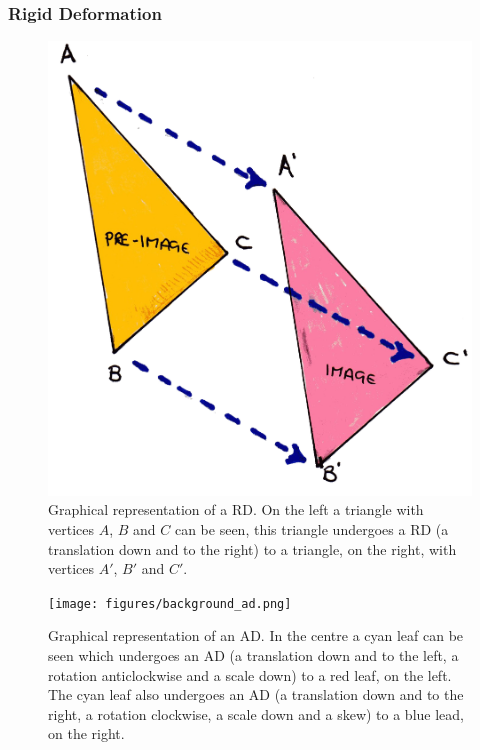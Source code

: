             \subsubsection{Rigid Deformation} \label{sec:rigid_deformation}
                \begin{figure}
                    \centering
                    
                    \includegraphics[width=1.0\linewidth]{figures/background_rd.png}
                    
                    \captionsetup{singlelinecheck=false, justification=raggedright}
                    \caption{Graphical representation of a \gls{RD}. On the left a triangle with vertices $A$, $B$ and $C$ can be seen, this triangle undergoes a \gls{RD} (a translation down and to the right) to a triangle, on the right, with vertices $A'$, $B'$ and $C'$.} \label{fig:rigid_transformations_rd}
                \end{figure}
                
                \begin{figure}
                    \centering
                    
                    \texttt{[image: figures/background\_ad.png]}
                    
                    \captionsetup{singlelinecheck=false, justification=raggedright}
                    \caption{Graphical representation of an \gls{AD}. In the centre a cyan leaf can be seen which undergoes an \gls{AD} (a translation down and to the left, a rotation anticlockwise and a scale down) to a red leaf, on the left. The cyan leaf also undergoes an \gls{AD} (a translation down and to the right, a rotation clockwise, a scale down and a skew) to a blue lead, on the right.} \label{fig:rigid_transformations_ad}
                \end{figure}
                
